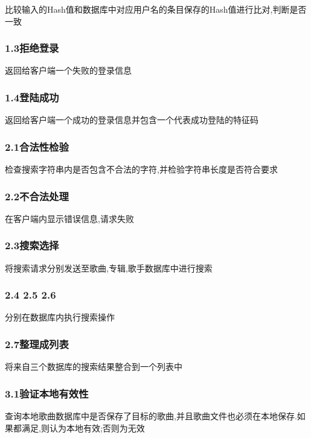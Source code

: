 比较输入的Hash值和数据库中对应用户名的条目保存的Hash值进行比对,判断是否一致

\subsubsection{1.3拒绝登录}

返回给客户端一个失败的登录信息

\subsubsection{1.4登陆成功}

返回给客户端一个成功的登录信息并包含一个代表成功登陆的特征码

\subsubsection{2.1合法性检验}

检查搜索字符串内是否包含不合法的字符,并检验字符串长度是否符合要求

\subsubsection{2.2不合法处理}

在客户端内显示错误信息,请求失败

\subsubsection{2.3搜索选择}

将搜索请求分别发送至歌曲,专辑,歌手数据库中进行搜索

\subsubsection{2.4 2.5 2.6}

分别在数据库内执行搜索操作

\subsubsection{2.7整理成列表}

将来自三个数据库的搜索结果整合到一个列表中

\subsubsection{3.1验证本地有效性}

查询本地歌曲数据库中是否保存了目标的歌曲,并且歌曲文件也必须在本地保存.如果都满足,则认为本地有效;否则为无效

